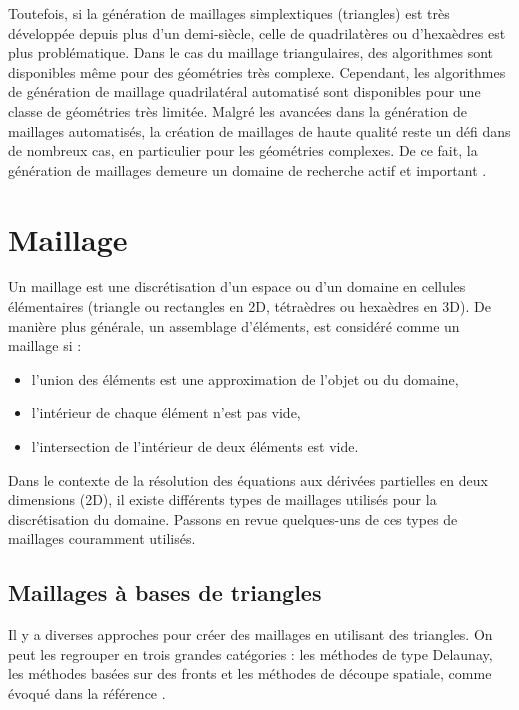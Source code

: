 Toutefois, si la génération de maillages simplextiques (triangles) est très développée depuis plus d'un demi-siècle, celle de quadrilatères ou d'hexaèdres est plus problématique.
Dans le cas du maillage triangulaires, des algorithmes sont disponibles même pour des géométries très complexe. Cependant, les algorithmes de génération de maillage quadrilatéral automatisé sont disponibles pour une classe de géométries très limitée. Malgré les avancées dans la génération de maillages automatisés, la création de maillages de haute qualité reste un défi dans de nombreux cas, en particulier pour les géométries complexes. De ce fait, la génération de maillages demeure un domaine de recherche actif et important \cite{shepherd2008hexahedral}.

\section{Maillage}

Un maillage est une discrétisation d'un espace ou d'un domaine en cellules élémentaires (triangle ou rectangles en 2D, tétraèdres ou hexaèdres en 3D). De manière plus générale, un assemblage d’éléments, est considéré comme un maillage si \cite{george2013mesh}:\\

\begin{itemize}
\item l’union des éléments est une approximation de l’objet ou du domaine,\\
\item l’intérieur de chaque élément n’est pas vide,\\
\item l’intersection de l’intérieur de deux éléments est vide.\\
\end{itemize}

 Dans le contexte de la résolution des équations aux dérivées partielles en deux dimensions (2D), il existe différents types de maillages utilisés pour la discrétisation du domaine. Passons en revue quelques-uns de ces types de maillages couramment utilisés.

\subsection{Maillages à bases de triangles}


Il y a diverses approches pour créer des maillages en utilisant des triangles. On peut les regrouper en trois grandes catégories : les méthodes de type Delaunay, les méthodes basées sur des fronts et les méthodes de découpe spatiale, comme évoqué dans la référence \cite{botella2016generation}.

